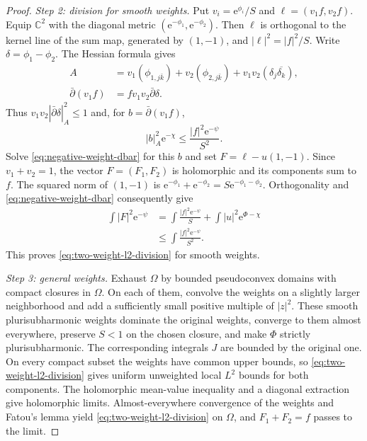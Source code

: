 \begin{proof}
\emph{Step 2: division for smooth weights.} Put $v_i=\mathrm e^{\phi_i}/S$ and $\ell=(v_1f,v_2f)$. Equip $\mathbb C^2$ with the diagonal metric $(\mathrm e^{-\phi_1},\mathrm e^{-\phi_2})$. Then $\ell$ is orthogonal to the kernel line of the sum map, generated by $(1,-1)$, and $|\ell|^2=|f|^2/S$. Write $\delta=\phi_1-\phi_2$. The Hessian formula gives
\[
 \begin{aligned}
 A&=v_1(\phi_{1,j\bar k})+v_2(\phi_{2,j\bar k})
       +v_1v_2(\delta_j\overline{\delta_k}),\\
 \bar\partial(v_1f)&=fv_1v_2\bar\partial\delta.
 \end{aligned}
\]
Thus $v_1v_2|\bar\partial\delta|_A^2\leq1$ and, for $b=\bar\partial(v_1f)$,
\[
 |b|_A^2\mathrm e^{-\chi}
 \leq\frac{|f|^2\mathrm e^{-\psi}}{S^2}.
\]
Solve \eqref{eq:negative-weight-dbar} for this $b$ and set $F=\ell-u(1,-1)$. Since $v_1+v_2=1$, the vector $F=(F_1,F_2)$ is holomorphic and its components sum to $f$. The squared norm of $(1,-1)$ is $\mathrm e^{-\phi_1}+\mathrm e^{-\phi_2}=S\mathrm e^{-\phi_1-\phi_2}$. Orthogonality and \eqref{eq:negative-weight-dbar} consequently give
\[
 \begin{aligned}
 \int |F|^2\mathrm e^{-\psi}
 &=\int\frac{|f|^2\mathrm e^{-\psi}}{S}
    +\int |u|^2\mathrm e^{\Phi-\chi}\\
 &\leq\int\frac{|f|^2\mathrm e^{-\psi}}{S^2}.
 \end{aligned}
\]
This proves \eqref{eq:two-weight-l2-division} for smooth weights.

\emph{Step 3: general weights.} Exhaust $\Omega$ by bounded pseudoconvex domains with compact closures in $\Omega$. On each of them, convolve the weights on a slightly larger neighborhood and add a sufficiently small positive multiple of $|z|^2$. These smooth plurisubharmonic weights dominate the original weights, converge to them almost everywhere, preserve $S<1$ on the chosen closure, and make $\Phi$ strictly plurisubharmonic. The corresponding integrals $J$ are bounded by the original one. On every compact subset the weights have common upper bounds, so \eqref{eq:two-weight-l2-division} gives uniform unweighted local $L^2$ bounds for both components. The holomorphic mean-value inequality and a diagonal extraction give holomorphic limits. Almost-everywhere convergence of the weights and Fatou's lemma yield \eqref{eq:two-weight-l2-division} on $\Omega$, and $F_1+F_2=f$ passes to the limit.
\end{proof}

